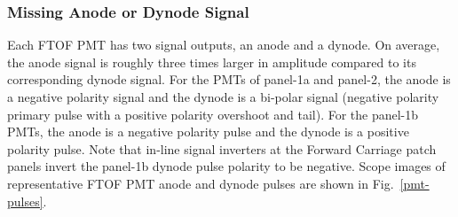 \documentclass[12pt]{article}
\begin{document}
\subsubsection{Missing Anode or Dynode Signal}
\label{missing}

Each FTOF PMT has two signal outputs, an anode and a dynode. On average, the anode 
signal is roughly three times larger in amplitude compared to its corresponding dynode 
signal. For the PMTs of panel-1a and panel-2, the anode is a negative polarity signal 
and the dynode is a bi-polar signal (negative polarity primary pulse with a positive 
polarity overshoot and tail). For the panel-1b PMTs, the anode is a negative polarity 
pulse and the dynode is a positive polarity pulse. Note that in-line signal inverters 
at the Forward Carriage patch panels invert the panel-1b dynode pulse polarity to be 
negative. Scope images of representative FTOF PMT anode and dynode pulses are shown 
in Fig.~\ref{pmt-pulses}.
\end{document}
